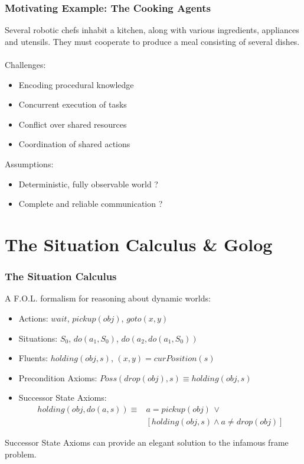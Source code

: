 \documentclass{beamer}
\begin{document}
\begin{frame}
\frametitle{Motivating Example: The Cooking Agents}
Several robotic chefs inhabit a kitchen, along with various ingredients,
appliances and utensils.  They must cooperate to produce a meal consisting
of several dishes.\\
\ \\
\pause
Challenges:
\begin{itemize}
  \item Encoding procedural knowledge
  \item Concurrent execution of tasks
  \item Conflict over shared resources
  \item Coordination of shared actions
\end{itemize}

\pause
Assumptions:
\begin{itemize}
  \item Deterministic, fully observable world ?
  \item Complete and reliable communication ?
\end{itemize}
\end{frame}


\section{The Situation Calculus \& Golog}

\begin{frame}
\frametitle{The Situation Calculus}

A F.O.L. formalism for reasoning about dynamic worlds:

\begin{itemize}
\pause
\item Actions: $wait$, $pickup(obj)$, $goto(x,y)$
\pause
\item Situations: $S_{0}$, $do(a_{1},S_{0})$, $do(a_{2},do(a_{1},S_{0}))$
\pause
\item Fluents: $holding(obj,s)$, $(x,y)=curPosition(s)$
\pause
\item Precondition Axioms: $Poss(drop(obj),s) \equiv holding(obj,s)$
\pause
\item Successor State Axioms:\[
\begin{array}{cc}
holding(obj,do(a,s))\equiv & a=pickup(obj)\,\vee\\
 & \left[holding(obj,s)\wedge a\neq drop(obj)\right]\end{array}\]
\end{itemize}
\pause
Successor State Axioms can provide an elegant solution to the infamous
frame problem.
\end{frame}
\end{document}
